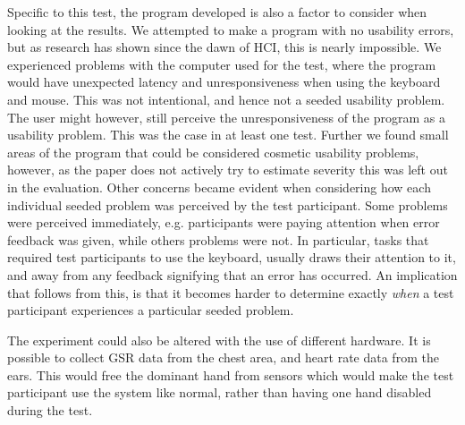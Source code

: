 Specific to this test, the program developed is also a factor to consider when looking at the results.  We attempted to
make a program with no usability errors, but as research has shown since the dawn of HCI, this is nearly impossible.  We
experienced problems with the computer used for the test, where the program would have unexpected latency and unresponsiveness when using the keyboard and mouse. This was not intentional, and hence not a seeded usability problem.
The user might however, still perceive the unresponsiveness of the program as a usability problem. 
This was the case in at least one test.  
Further we found small areas of the program that could be considered cosmetic usability problems, however, as the paper does not actively try
to estimate severity this was left out in the evaluation. Other concerns became evident when considering how each
individual seeded problem was perceived by the test participant. Some problems were perceived immediately,
e.g. participants were paying attention when error feedback was given, while others problems were not. In particular,
tasks that required test participants to use the keyboard, usually draws their attention to it, and away from any
feedback signifying that an error has occurred. An implication that follows from this, is that it becomes harder to
determine exactly \textit{when} a test participant experiences a particular seeded problem.

The experiment could also be altered with the use of different hardware. It is possible to collect GSR data from the chest area, and heart rate data from the ears. This would free the dominant hand from sensors which would make the test participant use the system like normal, rather than having one hand disabled during the test.\\

